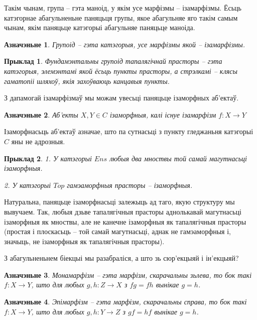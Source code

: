 \documentclass[a4paper,12pt]{book}
\newtheorem{example}{Прыклад}[section]
\newtheorem{definition}{Азначэньне}[section]
\begin{document}
Такім чынам, група -- гэта маноід, у якім усе марфізмы --
ізамарфізмы. Ёсьць катэгорнае абагульненьне паняцьця групы, якое
абагульняе яго такім самым чынам, якім паняцьце катэгорыі абагульняе
паняцьце маноіда.

\begin{definition}
  Групоід -- гэта катэгорыя, усе марфізмы якой -- ізамарфізмы.
\end{definition}

\begin{example}
  Фундамэнтальны групоід тапалягічнай прасторы -- гэта катэгорыя,
  элемэнтамі якой ёсьць пункты прасторы, а стрэлкамі -- клясы
  гаматопіі шляхоў, якія захоўваюць канцавыя пункты.
\end{example}

З дапамогай ізамарфізмаў мы можам увесьці паняцьце ізаморфных
аб'ектаў.

\begin{definition}
  Аб'екты $X, Y \in C$ ізаморфныя, калі існуе ізамарфізм $f: X
  \rightarrow Y$
\end{definition}

Ізаморфнасьць аб'ектаў азначае, што па сутнасьці з пункту гледжаньня
катэгорыі $C$ яны не адрозныя.

\begin{example}
  1. У катэгорыі $Ens$ любыя два мноствы той самай магутнасьці
  ізаморфныя.

  2. У катэгорыі $Top$ гамэаморфныя прасторы -- ізаморфныя.
\end{example}

Натуральна, паняцьце ізаморфнасьці залежыць ад таго, якую структуру мы
вывучаем. Так, любыя дзьве тапалягічныя прасторы аднолькавай
магутнасьці ізаморфныя як мноствы, але не канечне ізаморфныя як
тапалягічныя прасторы (простая і плоскасьць -- той самай магутнасьці,
аднак не гамэаморфныя і, значыць, не ізаморфныя як тапалягічныя прасторы).

З абагульненьнем біекцыі мы разабраліся, а што зь сюр'екцыяй і
ін'екцыяй?

\begin{definition}
  Монамарфізм -- гэта марфізм, скарачальны зьлева, то бок такі $f: X
  \rightarrow Y$, што для любых $g, h: Z \rightarrow X$ з $fg = fh$
  вынікае $g = h$.
\end{definition}

\begin{definition}
  Эпімарфізм -- гэта марфізм, скарачальны справа, то бок такі $f: X
  \rightarrow Y$, што для любых $g, h: Y \rightarrow Z$ з $gf = hf$
  вынікае $g = h$.
\end{definition}
\end{document}
